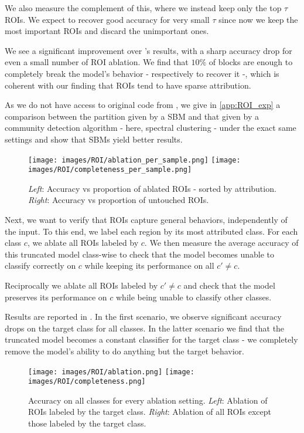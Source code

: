 \documentclass{article}
\begin{document}
We also measure the complement of this, where we instead keep only the top $\tau$ ROIs. We expect to recover good accuracy for very small $\tau$ since now we keep the most important ROIs and discard the unimportant ones.

We see a significant improvement over \citet{lu2019checking}'s results, with a sharp accuracy drop for even a small number of ROI ablation. We find that $10\%$ of blocks are enough to completely break the model's behavior - respectively to recover it -, which is coherent with our finding that ROIs tend to have sparse attribution.

As we do not have access to original code from \citet{lu2019checking}, we give in \cref{app:ROI_exp} a comparison between the partition given by a SBM and that given by a community detection algorithm - here, spectral clustering - under the exact same settings and show that SBMs yield better results.\\

\begin{figure}[h]
    \centering
    \texttt{[image: images/ROI/ablation\_per\_sample.png]}
    \hfill
    \texttt{[image: images/ROI/completeness\_per\_sample.png]}
    \caption{\textit{Left}: Accuracy vs proportion of ablated ROIs - sorted by attribution. \textit{Right}: Accuracy vs proportion of untouched ROIs.}
    \label{fig:sample_ablation}
\end{figure}

Next, we want to verify that ROIs capture general behaviors, independently of the input. To this end, we label each region by its most attributed class. For each class $c$, we ablate all ROIs labeled by $c$. We then measure the average accuracy of this truncated model class-wise to check that the model becomes unable to classify correctly on $c$ while keeping its performance on all $c' \ne c$.

Reciprocally we ablate all ROIs labeled by $c' \neq c$ and check that the model preserves its performance on $c$ while being unable to classify other classes.

Results are reported in . In the first scenario, we observe significant accuracy drops on the target class for all classes. In the latter scenario we find that the truncated model becomes a constant classifier for the target class - we completely remove the model's ability to do anything but the target behavior.

\begin{figure}[h]
    \centering
    \texttt{[image: images/ROI/ablation.png]}
    \hfill
    \texttt{[image: images/ROI/completeness.png]}
    \caption{Accuracy on all classes for every ablation setting. \textit{Left}: Ablation of ROIs labeled by the target class. \textit{Right}: Ablation of all ROIs except those labeled by the target class.}
    \label{fig:class_ablation}
\end{figure}
\end{document}
